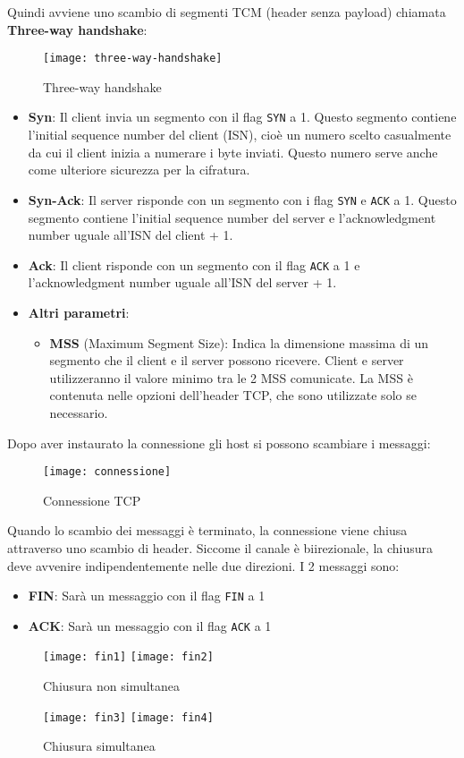 \documentclass[a4paper]{article}
\begin{document}
\vspace{1em}
\noindent
Quindi avviene uno scambio di segmenti TCM (header senza payload) chiamata
\textbf{Three-way handshake}:
\begin{figure}[H]
  \centering
  \texttt{[image: three-way-handshake]}
  \caption{Three-way handshake}
\end{figure}
\begin{itemize}
  \item \textbf{Syn}: Il client invia un segmento con il flag \texttt{SYN} a 1.
    Questo segmento contiene l'initial sequence number del client (ISN), cioè un numero 
    scelto casualmente da cui il client inizia a numerare i byte inviati. Questo numero
    serve anche come ulteriore sicurezza per la cifratura.

  \item \textbf{Syn-Ack}: Il server risponde con un segmento con i flag \texttt{SYN} e
    \texttt{ACK} a 1. Questo segmento contiene l'initial sequence number del server e
    l'acknowledgment number uguale all'ISN del client + 1.

  \item \textbf{Ack}: Il client risponde con un segmento con il flag \texttt{ACK} a 1 e
    l'acknowledgment number uguale all'ISN del server + 1.

  \item \textbf{Altri parametri}:
    \begin{itemize}
      \item \textbf{MSS} (Maximum Segment Size): Indica la dimensione massima di un
        segmento che il client e il server possono ricevere. Client e server utilizzeranno
        il valore minimo tra le 2 MSS comunicate. La MSS è contenuta nelle opzioni
        dell'header TCP, che sono utilizzate solo se necessario.
    \end{itemize}
\end{itemize}
Dopo aver instaurato la connessione gli host si possono scambiare i messaggi:
\begin{figure}[H]
  \centering
  \texttt{[image: connessione]}
  \caption{Connessione TCP}
\end{figure}
\noindent
Quando lo scambio dei messaggi è terminato, la connessione viene chiusa attraverso uno
scambio di header. Siccome il canale è biirezionale, la chiusura deve avvenire
indipendentemente nelle due direzioni. I 2 messaggi sono:
\begin{itemize}
  \item \textbf{FIN}: Sarà un messaggio con il flag \texttt{FIN} a 1
  \item \textbf{ACK}: Sarà un messaggio con il flag \texttt{ACK} a 1
\end{itemize}
\begin{figure}[H]
  \texttt{[image: fin1]}
  \texttt{[image: fin2]}
  \caption{Chiusura non simultanea}
\end{figure}
\begin{figure}[H]
  \texttt{[image: fin3]}
  \texttt{[image: fin4]}
  \caption{Chiusura simultanea}
\end{figure}
\end{document}
